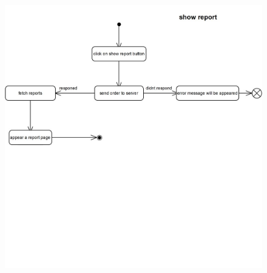 \documentclass[]{article}
\begin{document}
\begin{figure}[H]
\centering
\includegraphics[scale=0.6]{./activity/22}
\end{figure}
\end{document}
